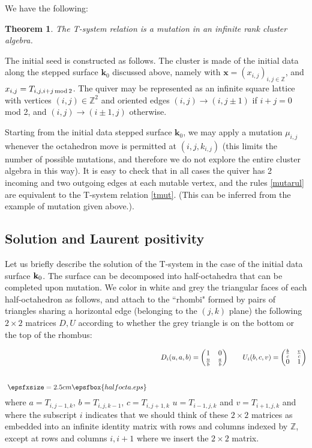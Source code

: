 \documentclass[12pt]{amsart}
\newtheorem{thm}{Theorem}[section]
\numberwithin{equation}{section}
\begin{document}
We have the following:

\begin{thm}\cite{DFK09}
The T-system relation is a mutation in an infinite rank cluster algebra.
\end{thm}

The initial seed is constructed as follows.
The cluster is made of the initial data along the stepped surface ${\mathbf k}_0$ discussed above,
namely with ${\mathbf x}=(x_{i,j})_{i,j\in {{\mathbb Z}}}$, and $x_{i,j}=T_{i,j,i+j\, {\rm mod}\, 2}$.
The quiver may be represented as an infinite square lattice with vertices $(i,j)\in {{\mathbb Z}}^2$ 
and oriented edges $(i,j)\to (i,j\pm 1)$ if $i+j=0$ mod 2, and $(i,j)\to (i\pm 1,j)$ otherwise.

Starting from the initial data stepped surface ${\mathbf k}_0$, we may apply a mutation $\mu_{i,j}$ whenever
the octahedron move is permitted at $(i,j,k_{i,j})$ (this limits the number of possible mutations, and therefore we
do not explore the entire cluster algebra in this way). It is easy to check that in all cases the quiver has 2 incoming
and two outgoing edges at each mutable vertex, and the rules \eqref{mutarul} are equivalent to the
T-system relation \eqref{tmut}. (This can be inferred from the example of mutation given above.).

\subsection{Solution and Laurent positivity}

Let us briefly describe the solution of the T-system in the case of the initial data surface ${\bf k}_0$.
The surface can be decomposed into half-octahedra that can be completed upon mutation. We color
in white and grey the triangular faces of each half-octahedron as follows, and attach to the ``rhombi" formed by pairs 
of triangles sharing a horizontal edge (belonging to the $(j,k)$ plane) the following $2\times2$ matrices $D,U$
according to whether the grey triangle is on the bottom or the top of the rhombus:

\begin{equation}
\label{halfocta}
\raise-1.5cm\hbox{ $\epsfxsize=2.5cm \epsfbox{halfocta.eps}  $} \qquad D_i(u,a,b)=
\begin{pmatrix}
1 & 0\\
\frac{u}{b} & \frac{a}{b}
\end{pmatrix}
\qquad U_i(b,c,v)=
\begin{pmatrix}
\frac{b}{c} & \frac{v}{c}\\
0& 1
\end{pmatrix}
\end{equation}
where $a=T_{i,j-1,k}$, $b=T_{i,j,k-1}$, $c=T_{i,j+1,k}$ $u=T_{i-1,j,k}$ and $v=T_{i+1,j,k}$ and where the subscript $i$ 
indicates that we should think of these $2\times 2$ matrices as embedded into an infinite identity matrix with rows and 
columns indexed by ${{\mathbb Z}}$, except at rows and columns $i,i+1$ where we insert the $2\times 2$ matrix.
\end{document}
